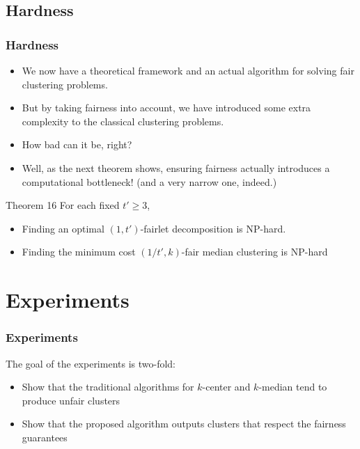 \documentclass{beamer}
\begin{document}

\subsection{Hardness}

\begin{frame}
\frametitle{Hardness}

\begin{itemize}
	\item We now have a theoretical framework and an actual algorithm for solving fair clustering problems. \pause
	
	\item But by taking fairness into account, we have introduced some extra complexity to the classical clustering problems. \pause
	
	\item How bad can it be, right? \pause
	
	\item Well, as the next theorem shows, ensuring fairness actually introduces a computational bottleneck! (and a very narrow one, indeed.) \pause
\end{itemize}

\begin{block}{Theorem 16}
For each fixed $t' \geq 3$,

\begin{itemize}
	\item Finding an optimal $(1, t')$-fairlet decomposition is \alert{NP-hard}.
	\item Finding the minimum cost $(1/t', k)$-fair median clustering is \alert{NP-hard}
\end{itemize}

\end{block}

\end{frame}


\section{Experiments}

\begin{frame}
\frametitle{Experiments}

The goal of the experiments is two-fold: \pause

\begin{itemize}
	\item Show that the traditional algorithms for $k$-center and $k$-median tend to produce unfair clusters \pause

	\item Show that the proposed algorithm outputs clusters that respect the fairness guarantees
\end{itemize}

\end{frame}
\end{document}
